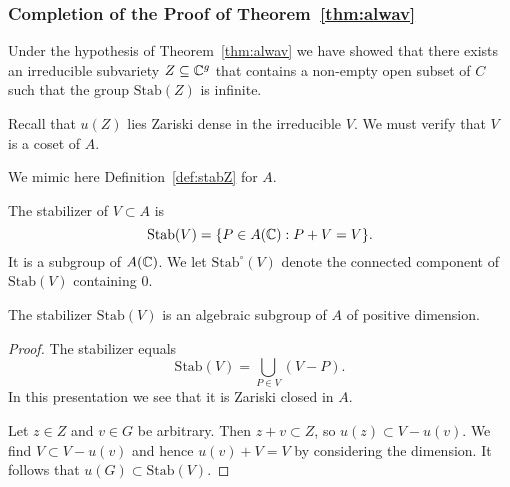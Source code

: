 \subsubsection{Completion of the Proof of Theorem~\ref{thm:alwav}}

Under the hypothesis of Theorem~\ref{thm:alwav} we have showed that
there exists an irreducible subvariety $Z\subseteq{\mathbb{C}}^g$ that contains a
non-empty open subset of $C$ such that the group $\mathrm{Stab}(Z)$ is infinite.



  

Recall that $u(Z)$ lies Zariski dense in the irreducible $V$. We must
verify that $V$ is a coset of $A$. %

We mimic here Definition~\ref{def:stabZ} for $A$. 
\begin{definition}
  The stabilizer of $V\subset A$ is
  \begin{equation*}
    \mathrm{Stab}(V) = \{P\in A({\mathbb{C}}) : P+V=V\}. 
  \end{equation*}
  It is a subgroup of $A({\mathbb{C}})$. We let $\mathrm{Stab}^\circ(V)$ denote
  the connected component of $\mathrm{Stab}(V)$ containing $0$. 
\end{definition}


\begin{lemma}
  The stabilizer $\mathrm{Stab}(V)$ is an algebraic subgroup of $A$ of
  positive dimension.
\end{lemma}
\begin{proof}
  The stabilizer equals
  \begin{equation*}
    \mathrm{Stab}(V) = \bigcup_{P \in V} (V-P).
  \end{equation*}
  In this presentation we see that it is Zariski closed in $A$.
  
  Let $z\in Z$ and $v\in G$ be arbitrary. Then $z+v\subset Z$,
  so $u(z) \subset V-u(v)$. We find $V\subset V-u(v)$ and hence
  $u(v)+V=V$ by considering the dimension.
  It follows that 
    $u(G) \subset\mathrm{Stab}(V)$.  
\end{proof}

